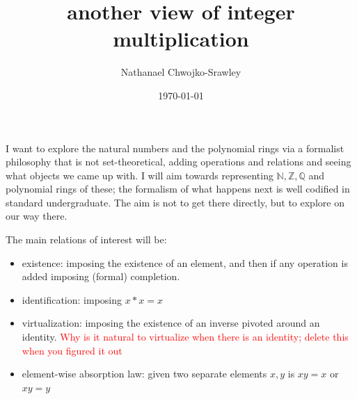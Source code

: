 \documentclass{article}
\title{another view of integer multiplication}
\author{Nathanael Chwojko-Srawley}
\date{\today}
\renewcommand{\maketitle}{
    \quad
    \vspace{1em}
  \begin{center}
      \LARGE\bfseries \thetitle \par
      \vspace{0.6em}
      \large
  \end{center}
    \vspace{1em}
}
\newcommand{\N}{{\mathbb{N}}}
\newcommand{\Q}{{\mathbb{Q}}}
\newcommand{\Z}{{\mathbb{Z}}}
\begin{document}
\maketitle


I want to explore the natural numbers and the polynomial rings via a formalist philosophy that is not set-theoretical,
adding operations and relations and seeing what objects we came up with. I will aim towards representing $\N, \Z,
\Q$ and polynomial rings of these; the formalism of what happens next is well codified in standard
undergraduate. The aim is not to get there directly, but to explore on our way there.

The main relations of interest will be:
\begin{itemize}
  \item existence: imposing the existence of an element, and then if any operation is added imposing (formal)
    completion.
  \item identification: imposing $x*x =x$
  \item virtualization: imposing the existence of an inverse pivoted around an identity. \textcolor{red}{Why is
    it natural to virtualize when there is an identity; delete this when you figured it out}
  \item element-wise absorption law: given two separate elements $x,y$ is $xy = x$ or $xy = y$
\end{itemize}
\end{document}
